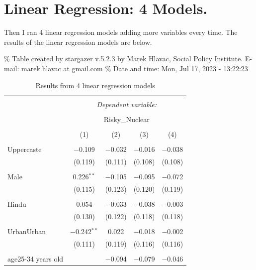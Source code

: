 \documentclass[
]{article}
\begin{document}
\newpage

\hypertarget{linear-regression-4-models.}{%
\section{Linear Regression: 4
Models.}\label{linear-regression-4-models.}}

Then I ran 4 linear regression models adding more variables every time.
The results of the linear regression models are below.

\begingroup\setlength{\tabcolsep}{1pt}\renewcommand{\arraystretch}{0.7}

\% Table created by stargazer v.5.2.3 by Marek Hlavac, Social Policy
Institute. E-mail: marek.hlavac at gmail.com \% Date and time: Mon, Jul
17, 2023 - 13:22:23

\begin{table}[!htbp] \centering 
  \caption{Results from 4 linear regression models} 
  \label{} 
\begin{tabular}{@{\extracolsep{5pt}}lcccc} 
\\[-1.8ex]\hline 
\hline \\[-1.8ex] 
 & \multicolumn{4}{c}{\textit{Dependent variable:}} \\ 
\cline{2-5} 
\\[-1.8ex] & \multicolumn{4}{c}{Risky\_Nuclear} \\ 
\\[-1.8ex] & (1) & (2) & (3) & (4)\\ 
\hline \\[-1.8ex] 
 Uppercaste & $-$0.109 & $-$0.032 & $-$0.016 & $-$0.038 \\ 
  & (0.119) & (0.111) & (0.108) & (0.108) \\ 
  & & & & \\ 
 Male & 0.226$^{**}$ & $-$0.105 & $-$0.095 & $-$0.072 \\ 
  & (0.115) & (0.123) & (0.120) & (0.119) \\ 
  & & & & \\ 
 Hindu & 0.054 & $-$0.033 & $-$0.038 & $-$0.003 \\ 
  & (0.130) & (0.122) & (0.118) & (0.118) \\ 
  & & & & \\ 
 UrbanUrban & $-$0.242$^{**}$ & 0.022 & $-$0.018 & $-$0.002 \\ 
  & (0.111) & (0.119) & (0.116) & (0.116) \\ 
  & & & & \\ 
 age25-34 years old &  & $-$0.094 & $-$0.079 & $-$0.046 \\ 

\end{tabular}
\end{table}
\end{document}
